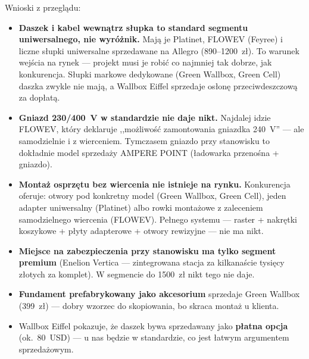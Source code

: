 \documentclass[11pt,a4paper]{article}
\begin{document}
Wnioski z przeglądu:
\begin{itemize}
\item \textbf{Daszek i kabel wewnątrz słupka to standard segmentu uniwersalnego, nie wyróżnik.}
Mają je Platinet, FLOWEV (Feyree) i liczne słupki uniwersalne sprzedawane na Allegro (890--1200~zł).
To warunek wejścia na rynek --- projekt musi je robić co najmniej tak dobrze, jak konkurencja.
Słupki markowe dedykowane (Green Wallbox, Green Cell) daszka zwykle nie mają, a Wallbox Eiffel
sprzedaje osłonę przeciwdeszczową za dopłatą.
\item \textbf{Gniazd 230/400~V w standardzie nie daje nikt.} Najdalej idzie FLOWEV, który deklaruje
,,możliwość zamontowania gniazdka 240~V'' --- ale samodzielnie i z wierceniem. Tymczasem gniazdo przy
stanowisku to dokładnie model sprzedaży AMPERE POINT (ładowarka przenośna + gniazdo).
\item \textbf{Montaż osprzętu bez wiercenia nie istnieje na rynku.} Konkurencja oferuje: otwory pod
konkretny model (Green Wallbox, Green Cell), jeden adapter uniwersalny (Platinet) albo rowki montażowe
z zaleceniem samodzielnego wiercenia (FLOWEV). Pełnego systemu --- raster + nakrętki koszykowe +
płyty adapterowe + otwory rewizyjne --- nie ma nikt.
\item \textbf{Miejsce na zabezpieczenia przy stanowisku ma tylko segment premium} (Enelion Vertica ---
zintegrowana stacja za kilkanaście tysięcy złotych za komplet). W segmencie do 1500~zł nikt tego nie daje.
\item \textbf{Fundament prefabrykowany jako akcesorium} sprzedaje Green Wallbox (399~zł) --- dobry
wzorzec do skopiowania, bo skraca montaż u klienta.
\item Wallbox Eiffel pokazuje, że daszek bywa sprzedawany jako \textbf{płatna opcja} (ok.~80~USD) ---
u nas będzie w standardzie, co jest łatwym argumentem sprzedażowym.
\end{itemize}
\end{document}

